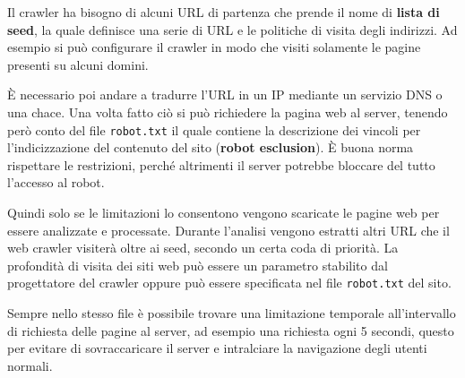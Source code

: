 Il crawler ha bisogno di alcuni URL di partenza che prende il nome di \textbf{lista di seed}, la quale definisce una serie di URL e le politiche di visita degli indirizzi.
Ad esempio si può configurare il crawler in modo che visiti solamente le pagine presenti su alcuni domini.

\`E necessario poi andare a tradurre l'URL in un IP mediante un servizio DNS o una chace. Una volta fatto ciò si può richiedere la pagina web al server, tenendo però conto del file \texttt{robot.txt} il quale contiene la descrizione dei vincoli per l'indicizzazione del contenuto del sito (\textbf{robot esclusion}).
\`E buona norma rispettare le restrizioni, perché altrimenti il server potrebbe bloccare del tutto l'accesso al robot.

Quindi solo se le limitazioni lo consentono vengono scaricate le pagine web per essere analizzate e processate. Durante l'analisi vengono estratti altri URL che il web crawler visiterà oltre ai seed, secondo un certa coda di priorità.
La profondità di visita dei siti web può essere un parametro stabilito dal progettatore del crawler oppure può essere specificata nel file \texttt{robot.txt} del sito.

Sempre nello stesso file è possibile trovare una limitazione temporale all'intervallo di richiesta delle pagine al server, ad esempio una richiesta ogni 5 secondi, questo per evitare di sovraccaricare il server e intralciare la navigazione degli utenti normali.



















